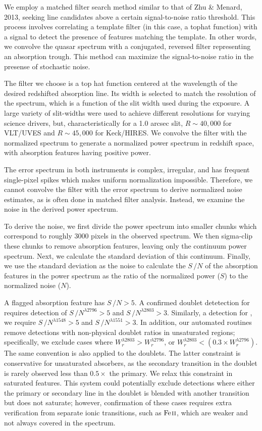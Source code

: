 We employ a matched filter search method similar to that of Zhu \& Menard, 2013, seeking line candidates above a certain signal-to-noise ratio threshold. This process involves correlating a template filter (in this case, a tophat function) with a signal to detect the presence of features matching the template. In other words, we convolve the quasar spectrum with a conjugated, reversed filter representing an absorption trough. This method can maximize the signal-to-noise ratio in the presense of stochastic noise.

The filter we choose is a top hat function centered at the wavelength of the desired redshifted absorption line. Its width is selected to match the resolution of the spectrum, which is a function of the slit width used during the exposure. A large variety of slit-widths were used to achieve different resolutions for varying science drivers, but, characteristically for a 1.0 arcsec slit, $R \sim 40,000$ for VLT/UVES and $R \sim 45,000$ for Keck/HIRES. We convolve the filter with the normalized spectrum to generate a normalized power spectrum in redshift space, with absorption features having positive power.

The error spectrum in both instruments is complex, irregular, and has frequent single-pixel spikes which makes uniform normalization impossible. Therefore, we cannot convolve the filter with the error spectrum to derive normalized noise estimates, as is often done in matched filter analysis. Instead, we examine the noise in the derived power spectrum.

To derive the noise, we first divide the power spectrum into smaller chunks which correspond to roughly 3000 pixels in the observed spectrum. We then sigma-clip these chunks to remove absorption features, leaving only the continuum power spectrum. Next, we calculate the standard deviation of this continuum. Finally, we use the standard deviation as the noise to calculate the $S\,/N$ of the absorption features in the power spectrum as the ratio of the normalized power ($S$) to the normalized noise ($N$).

A flagged absorption feature has $S\,/N > 5$. A confirmed doublet detetection for {\MgIIdblt} requires detection of $S\,/N^{\lambda2796} > 5$ and $S\,/N^{\lambda2803} > 3$. Similarly, a detection for {\CIVdblt}, we require $S\,/N^{\lambda1548} > 5$ and $S\,/N^{\lambda1551} > 3$. In addition, our automated routines remove detections with non-physical doublet ratios in unsaturated regions; specifically, we exclude cases where $W_r^{\lambda2803} > W_r^{\lambda2796}$, or $W_r^{\lambda2803} < \left(0.3 \times W_r^{\lambda2796}\right)$. The same convention is also applied to the {\CIV} doublets. The latter constraint is conservative for unsaturated absorbers, as the secondary transition in the doublet is rarely observed less than $0.5 \times$ the primary. We relax this constraint in saturated features. This system could potentially exclude detections where either the primary or secondary line in the doublet is blended with another transition but does not saturate; however, confirmation of these cases requires extra verification from separate ionic transitions, such as ${\hbox{{\rm Fe}\kern 0.1em{\sc ii}}}$, which are weaker and not always covered in the spectrum.

